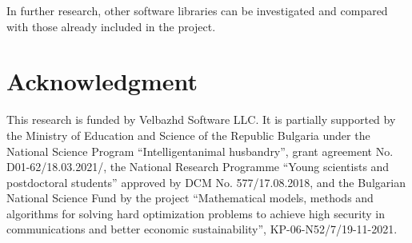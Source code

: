 \documentclass[conference]{IEEEtran}
\begin{document}
In further research, other software libraries can be investigated and compared with those already included in the project.

\section*{Acknowledgment}

This research is funded by Velbazhd Software LLC. It is partially supported by the Ministry of Education and Science of the Republic Bulgaria under the National Science Program “Intelligentanimal husbandry”, grant agreement No. D01-62/18.03.2021/, the National Research Programme “Young scientists and postdoctoral students” approved by DCM No. 577/17.08.2018, and the Bulgarian National Science Fund by the project “Mathematical models, methods and algorithms for solving hard optimization problems to achieve high security in communications and better economic sustainability”, KP-06-N52/7/19-11-2021.


\end{document}
